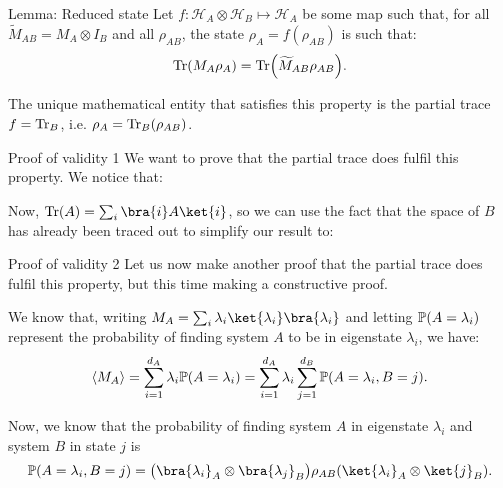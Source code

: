 \documentclass[a4paper]{article}
\begin{document}
\begin{parag}{Lemma: Reduced state}
    Let $f: \mathcal{H}_{A} \otimes \mathcal{H}_B \mapsto \mathcal{H}_A$ be some map such that, for all $\widetilde{M}_{AB} = M_A \otimes I_B$ and all $\rho_{AB}$, the state $\rho_A = f\left(\rho_{AB}\right)$ is such that: 
    \[\Tr\left(M_A \rho_A\right) = \Tr\left(\widetilde{M}_{AB} \rho_{AB}\right).\]

    The unique mathematical entity that satisfies this property is the partial trace $f = \operatorname{Tr}_B$, i.e. $\rho_A = \Tr_B\left(\rho_{AB}\right)$.

    \begin{subparag}{Proof of validity 1}
        We want to prove that the partial trace does fulfil this property. We notice that: 

        Now, $\Tr\left(A\right) = \sum_{i} \bra{i} A \ket{i}$, so we can use the fact that the space of $B$ has already been traced out to simplify our result to: 
    \end{subparag}

    \begin{subparag}{Proof of validity 2}
        Let us now make another proof that the partial trace does fulfil this property, but this time making a constructive proof. 

        We know that, writing $M_A = \sum_{i} \lambda_i \ket{\lambda_i}\bra{\lambda_i}$ and letting $\prob\left(A = \lambda_i\right)$ represent the probability of finding system $A$ to be in eigenstate $\lambda_i$, we have:
        \[\left\langle M_A \right\rangle = \sum_{i=1}^{d_A} \lambda_i \prob\left(A = \lambda_i\right) = \sum_{i=1}^{d_A} \lambda_i \sum_{j=1}^{d_B} \prob\left(A = \lambda_i, B = j\right).\]
        
        Now, we know that the probability of finding system $A$ in eigenstate $\lambda_i$ and system $B$ in state $j$ is 
        \[\prob\left(A = \lambda_i, B = j\right) = \left(\bra{\lambda_i}_A \otimes \bra{\lambda_j}_B\right) \rho_{AB} \left(\ket{\lambda_i}_A \otimes \ket{j}_B\right).\]


\end{subparag}
\end{parag}
\end{document}
